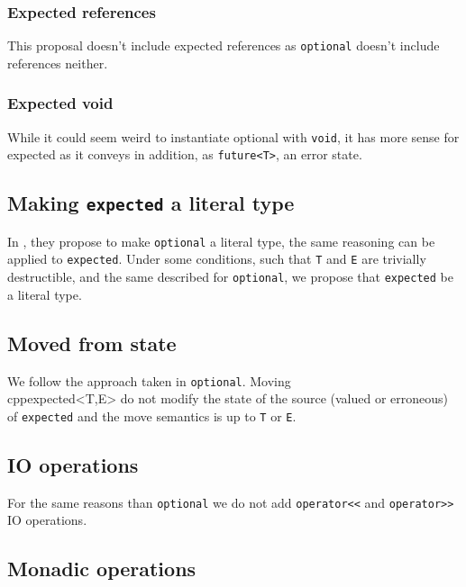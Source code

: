 \documentclass[a4paper,10pt]{article}
\newcommand{\cpp}[1]{\lstinline{#1}}
\begin{document}
\subsubsection{Expected references}

This proposal doesn't include expected references as \cpp{optional}\cite{OptionalRev5} doesn't include references neither.

\subsubsection{Expected void}

While it could seem weird to instantiate optional with \cpp{void}, it has more sense for expected as it conveys in addition, as \cpp{future<T>}, an error state.

\subsection{Making \cpp{expected} a literal type}

In \cite{OptionalRev4}, they propose to make \cpp{optional} a literal type, the same reasoning can be applied to \cpp{expected}. Under some conditions, such that \cpp{T} and \cpp{E} are trivially destructible, and the same described for \cpp{optional}, we propose that \cpp{expected} be a literal type.

\subsection{Moved from state}

We follow the approach taken in \cpp{optional}\cite{OptionalRev4}. Moving \\cpp{expected<T,E>} do not modify the state of the source (valued or erroneous) of \cpp{expected} and the move semantics is up to \cpp{T} or \cpp{E}.

\subsection{IO operations}

For the same reasons than \cpp{optional}\cite{OptionalRev4} we do not add \cpp{operator<<} and \cpp{operator>>} IO operations.

\subsection{Monadic operations}
\label{monadic-operations}
\end{document}
